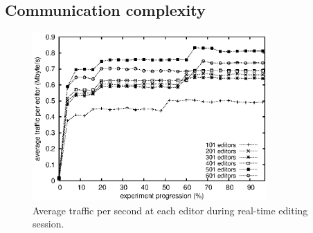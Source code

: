 
\subsection{Communication complexity}

\begin{figure}
  \centering
  \includegraphics[width=0.8\textwidth]{./img/traffic.eps}
  \caption{\label{fig:traffic} Average traffic per second at each editor during
    real-time editing session.}
\end{figure}

